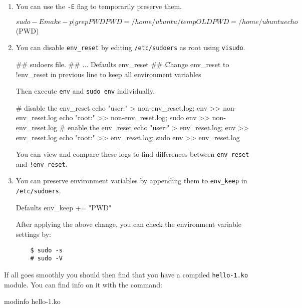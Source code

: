 \documentclass[10pt, oneside]{book}
\begin{document}
\begin{enumerate}
  \item {
  You can use the \verb|-E| flag to temporarily preserve them.

  \begin{codebash}
    $ sudo -E make -p | grep PWD
    PWD = /home/ubuntu/temp
    OLDPWD = /home/ubuntu
    echo $(PWD)
  \end{codebash}
  }

  \item {
  You can disable \verb|env_reset| by editing \verb|/etc/sudoers| as root using \verb|visudo|.

  \begin{code}
  ## sudoers file.
  ##
  ...
  Defaults env_reset
  ## Change env_reset to !env_reset in previous line to keep all environment variables
  \end{code}

  Then execute \verb|env| and \verb|sudo env| individually.

  \begin{codebash}
    # disable the env_reset
    echo "user:" > non-env_reset.log; env >> non-env_reset.log
    echo "root:" >> non-env_reset.log; sudo env >> non-env_reset.log
    # enable the env_reset
    echo "user:" > env_reset.log; env >> env_reset.log
    echo "root:" >> env_reset.log; sudo env >> env_reset.log
  \end{codebash}

  You can view and compare these logs to find differences between \verb|env_reset| and \verb|!env_reset|.
  }

  \item {You can preserve environment variables by appending them to \verb|env_keep| in \verb|/etc/sudoers|.

  \begin{code}
  Defaults env_keep += "PWD"
  \end{code}

  After applying the above change, you can check the environment variable settings by:

  \begin{verbatim}
    $ sudo -s
    # sudo -V
  \end{verbatim}
  }
\end{enumerate}

If all goes smoothly you should then find that you have a compiled \verb|hello-1.ko| module.
You can find info on it with the command:
\begin{codebash}
modinfo hello-1.ko
\end{codebash}
\end{document}
